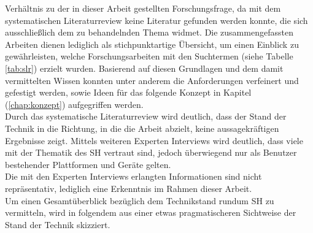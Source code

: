     Verhältnis zu der in dieser Arbeit gestellten Forschungsfrage, da mit dem systematischen Literaturreview keine Literatur 
    gefunden werden konnte, die sich ausschließlich dem zu behandelnden Thema widmet. Die zusammengefassten Arbeiten dienen 
    lediglich als stichpunktartige Übersicht, um einen Einblick zu gewährleisten, welche Forschungsarbeiten mit den 
    Suchtermen (siehe Tabelle \ref{tab:slr}) erzielt wurden. Basierend auf diesen Grundlagen und dem damit vermittelten Wissen 
    konnten unter anderem die Anforderungen verfeinert und gefestigt werden, sowie Ideen für das folgende Konzept in Kapitel 
    (\ref{chap:konzept}) aufgegriffen werden.
    \\ 
    Durch das systematische Literaturreview wird deutlich, dass der Stand der Technik in die Richtung, in die die Arbeit 
    abzielt, keine aussagekräftigen Ergebnisse zeigt. Mittels weiteren Experten Interviews wird deutlich, dass viele mit der 
    Thematik des \acl{SH} vertraut sind, jedoch überwiegend nur als Benutzer bestehender Plattformen und Geräte gelten.
    \\
    Die mit den Experten Interviews erlangten Informationen sind nicht repräsentativ, lediglich eine Erkenntnis im Rahmen 
    dieser Arbeit.
    \\
    Um einen Gesamtüberblick bezüglich dem Technikstand rundum \acl{SH} zu vermitteln, 
    wird in folgendem aus einer etwas pragmatischeren Sichtweise der Stand der Technik skizziert.
    
